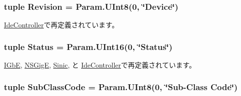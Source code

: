\label{classPci_1_1PciDevice_a88eb1645e6dce97606bd6f1bf6decfed}
\hypertarget{classPci_1_1PciDevice_a3e8a079e8f2eda26d5e301091db1f5ee}{
\subsubsection[{Revision}]{\setlength{\rightskip}{0pt plus 5cm}tuple {\bf Revision} = Param.UInt8(0, \char`\"{}Device\char`\"{})}}
\label{classPci_1_1PciDevice_a3e8a079e8f2eda26d5e301091db1f5ee}


\hyperlink{classIde_1_1IdeController_a1c872d7167f0869b85418babe0ca6ced}{IdeController}で再定義されています。\hypertarget{classPci_1_1PciDevice_aba3540dcad58fc3d3042791b42b96b98}{
\subsubsection[{Status}]{\setlength{\rightskip}{0pt plus 5cm}tuple {\bf Status} = Param.UInt16(0, \char`\"{}Status\char`\"{})}}
\label{classPci_1_1PciDevice_aba3540dcad58fc3d3042791b42b96b98}


\hyperlink{classEthernet_1_1IGbE_ae58c2415cf1178457fa1254234c3f017}{IGbE}, \hyperlink{classEthernet_1_1NSGigE_ae58c2415cf1178457fa1254234c3f017}{NSGigE}, \hyperlink{classEthernet_1_1Sinic_ae58c2415cf1178457fa1254234c3f017}{Sinic}, と \hyperlink{classIde_1_1IdeController_ae58c2415cf1178457fa1254234c3f017}{IdeController}で再定義されています。\hypertarget{classPci_1_1PciDevice_aa5dab65525a81097713cebf095217409}{
\subsubsection[{SubClassCode}]{\setlength{\rightskip}{0pt plus 5cm}tuple {\bf SubClassCode} = Param.UInt8(0, \char`\"{}Sub-\/Class Code\char`\"{})}}
\label{classPci_1_1PciDevice_aa5dab65525a81097713cebf095217409}


